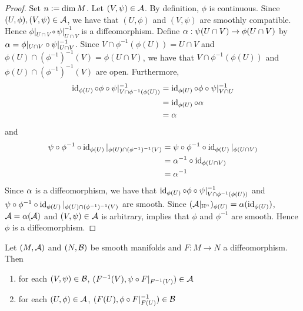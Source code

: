 \documentclass{book}
\begin{document}
\begin{proof}
	Set $n \vcentcolon= \dim M$. Let $(V, \psi) \in \mathcal{A}$. By definition, $\phi$ is continuous. Since $(U, \phi), (V, \psi) \in \mathcal{A}$, we have that $(U, \phi)$ and $(V, \psi)$ are smoothly compatible. Hence $\phi|_{U \cap V} \circ \psi|_{U \cap V}^{-1}$ is a diffeomorphism. Define $\alpha: \psi(U \cap V) \rightarrow \phi(U \cap V)$ by $\alpha = \phi|_{U \cap V} \circ \psi|_{U \cap V}^{-1}$. Since $V \cap \phi^{-1}(\phi(U)) = U \cap V$ and $\phi(U) \cap (\phi^{-1})^{-1}(V) = \phi(U \cap V)$, we have that $V \cap \phi^{-1}(\phi(U))$ and $\phi(U) \cap (\phi^{-1})^{-1}(V) $ are open. Furthermore,
	\begin{align*}
		\operatorname{id}_{\phi(U)} \circ \phi \circ \psi|_{V \cap \phi^{-1}(\phi(U))}^{-1} 
		& = \operatorname{id}_{\phi(U)} \circ \phi \circ \psi|_{V \cap U}^{-1} \\
		& = \operatorname{id}_{\phi(U)} \circ \alpha \\
		& = \alpha
	\end{align*}
	and
	\begin{align*}
		\psi \circ \phi^{-1} \circ \operatorname{id}_{\phi(U)}|_{\phi(U) \cap (\phi^{-1})^{-1}(V)} 
		& = \psi \circ \phi^{-1} \circ \operatorname{id}_{\phi(U)}|_{\phi(U \cap V)} \\
		& = \alpha^{-1} \circ \operatorname{id}_{\phi(U \cap V)} \\
		& = \alpha^{-1} 
	\end{align*}
	Since $\alpha$ is a diffeomorphism, we have that $\operatorname{id}_{\phi(U)} \circ \phi \circ \psi|_{V \cap \phi^{-1}(\phi(U))}^{-1}$ and $\psi \circ \phi^{-1} \circ \operatorname{id}_{\phi(U)}|_{\phi(U) \cap (\phi^{-1})^{-1}(V)}$ are smooth. Since $(\mathcal{A}|_{\mathbb{H}^n})_{\phi(U)} = \alpha(\operatorname{id}_{\phi(U)})$, $\mathcal{A} = \alpha(\mathcal{A})$ and $(V, \psi) \in \mathcal{A}$ is arbitrary,  implies that $\phi$ and $\phi^{-1}$ are smooth. Hence $\phi$ is a diffeomorphism. 
\end{proof}

\begin{ex} 
	Let  $(M, \mathcal{A})$ and $(N, \mathcal{B})$ be smooth manifolds and $F: M \rightarrow N$ a diffeomorphism. Then 
	\begin{enumerate}
		\item for each $(V, \psi) \in \mathcal{B}$, $(F^{-1}(V), \psi \circ F|_{F^{-1}(V)}) \in \mathcal{A}$
		\item for each $(U, \phi) \in \mathcal{A}$, $(F(U), \phi \circ F|_{F(U)}^{-1}) \in \mathcal{B}$
	\end{enumerate}
\end{ex}
\end{document}
